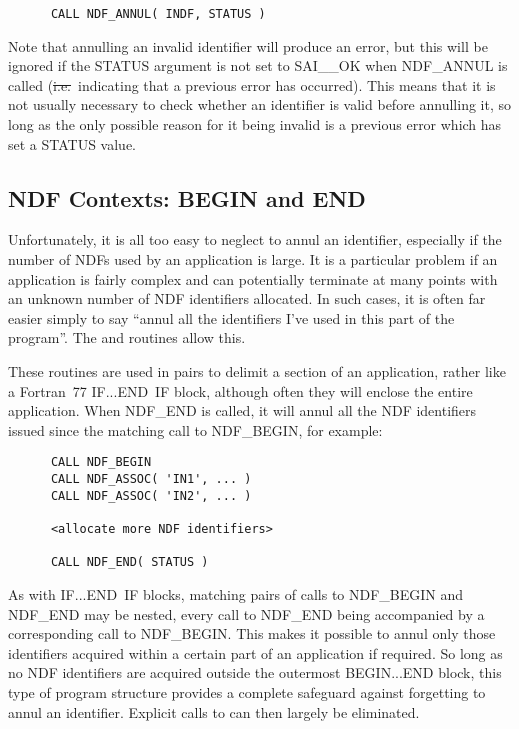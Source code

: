 \small
\begin{verbatim}
      CALL NDF_ANNUL( INDF, STATUS )
\end{verbatim}
\normalsize

Note that annulling an invalid identifier will produce an error, but this will
be ignored if the STATUS argument is not set to SAI\_\_OK when NDF\_ANNUL is
called (\st{i.e.}\ indicating that a previous error has occurred).
This means that it is not usually necessary to check whether an identifier
is valid before annulling it, so long as the only possible reason for it being
invalid is a previous error which has set a STATUS value. 

\subsection{\label{ss:beginend}NDF Contexts: BEGIN and END}

Unfortunately, it is all too easy to neglect to annul an identifier,  especially
if the number of NDFs used by an application is large.
It is a particular problem if an application is fairly complex and can
potentially terminate at many points with an unknown number of NDF identifiers
allocated.
In such cases, it is often far easier simply to say ``annul all the
identifiers I've used in this part of the program''. 
The  and  routines allow this.

These routines are used in pairs to delimit a section of an application, rather
like a Fortran~77 IF...END~IF block, although often they will enclose the
entire application. 
When NDF\_END is called, it will annul all the NDF identifiers issued since
the matching call to NDF\_BEGIN, for example: 

\small
\begin{verbatim}
      CALL NDF_BEGIN
      CALL NDF_ASSOC( 'IN1', ... )
      CALL NDF_ASSOC( 'IN2', ... )

      <allocate more NDF identifiers>

      CALL NDF_END( STATUS )
\end{verbatim}
\normalsize

As with IF...END~IF blocks, matching pairs of calls to NDF\_BEGIN and NDF\_END
may be nested, every call to NDF\_END being accompanied by a corresponding call
to NDF\_BEGIN. 
This makes it possible to annul only those identifiers acquired within a 
certain part of an application if required.
So long as no NDF identifiers are acquired outside the outermost BEGIN...END
block, this type of program structure provides a complete safeguard against
forgetting to annul an identifier. 
Explicit calls to  can then largely be eliminated.

